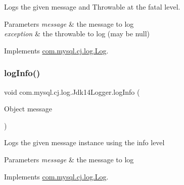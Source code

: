 Logs the given message and Throwable at the \textquotesingle{}fatal\textquotesingle{} level.


\begin{DoxyParams}{Parameters}
{\em message} & the message to log \\
\hline
{\em exception} & the throwable to log (may be null) \\
\hline
\end{DoxyParams}


Implements \mbox{\hyperlink{interfacecom_1_1mysql_1_1cj_1_1log_1_1_log_a54cd5e19bf210ab86b373400e2213229}{com.\+mysql.\+cj.\+log.\+Log}}.

\mbox{\label{classcom_1_1mysql_1_1cj_1_1log_1_1_jdk14_logger_afb7e72826582a918eb3ec8b14549a7d0}} 
\subsubsection{\texorpdfstring{log\+Info()}{logInfo()}\hspace{0.1cm}{\footnotesize\ttfamily [1/2]}}
{\footnotesize\ttfamily void com.\+mysql.\+cj.\+log.\+Jdk14\+Logger.\+log\+Info (\begin{DoxyParamCaption}\item[{Object}]{message }\end{DoxyParamCaption})}

Logs the given message instance using the \textquotesingle{}info\textquotesingle{} level


\begin{DoxyParams}{Parameters}
{\em message} & the message to log \\
\hline
\end{DoxyParams}


Implements \mbox{\hyperlink{interfacecom_1_1mysql_1_1cj_1_1log_1_1_log_a7f117433067520dd682da12ff9194f4b}{com.\+mysql.\+cj.\+log.\+Log}}.

\mbox{\label{classcom_1_1mysql_1_1cj_1_1log_1_1_jdk14_logger_a439d3b7c7b21fd3f766bed9729e77551}} 

